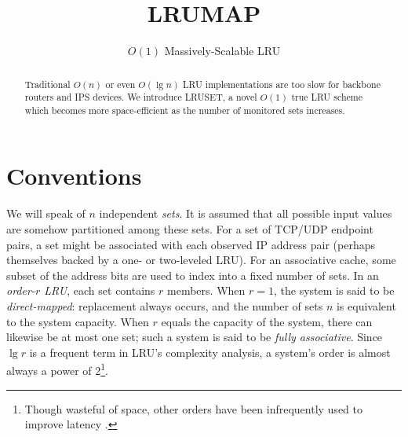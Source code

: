 \documentclass[10pt]{sigplanconf}
\begin{document}

\title{LRUMAP}
\subtitle{$O(1)$ Massively-Scalable LRU}

\maketitle
\begin{abstract}
Traditional $O(n)$ or even $O(\lg{n})$ LRU implementations are too slow for
backbone routers and IPS devices. We introduce LRUSET, a novel $O(1)$ true LRU
scheme which becomes more space-efficient as the number of monitored sets
increases.
\end{abstract}




\section{Conventions}
We will speak of $n$ independent \textit{sets}. It is assumed that all possible
input values are somehow partitioned among these sets. For a set of TCP/UDP
endpoint pairs, a set might be associated with each observed IP address pair
(perhaps themselves backed by a one- or two-leveled LRU). For an associative
cache, some subset of the address bits are used to index into a fixed number of
sets. In an \textit{order-$r$ LRU}, each set contains $r$ members. When $r=1$,
the system is said to be \textit{direct-mapped}: replacement always occurs, and
the number of sets $n$ is equivalent to the system capacity. When $r$ equals
the capacity of the system, there can likewise be at most one set; such a system
is said to be \textit{fully associative}. Since $\lg{r}$ is a frequent term in
LRU's complexity analysis, a system's order is almost always a power of 2\footnote{Though
wasteful of space, other orders have been infrequently used to improve latency \citep{intelcpuid}.}.
\end{document}
